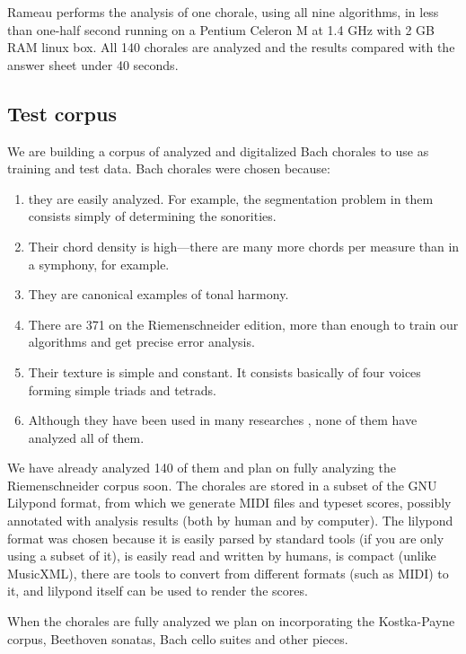\documentclass{article}
\begin{document}
Rameau performs the analysis of one chorale, using all nine
algorithms, in less than one-half second running on a Pentium Celeron
M at 1.4 GHz with 2 GB RAM linux box. All 140 chorales are analyzed
and the results compared with the answer sheet under 40 seconds.

\subsection{Test corpus}
\label{sec:test-corpus}

We are building a corpus of analyzed and digitalized Bach chorales to
use as training and test data. Bach chorales were chosen because:

\begin{enumerate}
\item they are easily analyzed. For example, the segmentation problem in
them consists simply of determining the sonorities.
\item Their chord density is high---there are many more chords per
  measure than in a symphony, for example.
\item They are canonical examples of tonal harmony.
\item There are 371 on the Riemenschneider edition, more than
  enough to train our algorithms and get precise error analysis.
\item Their texture is simple and constant. It consists basically of
  four voices forming simple triads and tetrads.
\item Although they have been used in many researches \cite{taube:automatic,
    tsui:harmonic, illescas.ea:harmonic, winograd:linguistics}, none
  of them have analyzed all of them.
\end{enumerate}

We have already analyzed 140 of them and plan on fully analyzing the
Riemenschneider corpus soon. The chorales are stored in a subset of
the GNU Lilypond format, from which we generate MIDI files and typeset
scores, possibly annotated with analysis results (both by human and by
computer). The lilypond format was chosen because it is easily parsed
by standard tools (if you are only using a subset of it), is easily
read and written by humans, is compact (unlike MusicXML), there are
tools to convert from different formats (such as MIDI) to it, and
lilypond itself can be used to render the scores.

When the chorales are fully analyzed we plan on incorporating the
Kostka-Payne \cite{kostka.ea:tonal} corpus, Beethoven sonatas, Bach
cello suites and other pieces.
\end{document}
